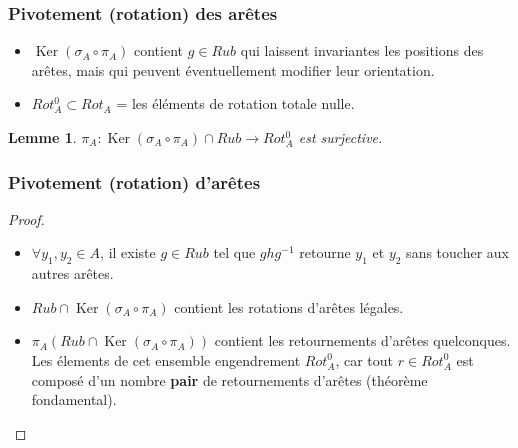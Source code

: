 \documentclass[10pt,notheorems]{beamer}
\theoremstyle{plain}
\theoremstyle{definition}
\theoremstyle{plain}
\theoremstyle{plain}
\newtheorem{lemma}{Lemme}
\theoremstyle{plain}
\theoremstyle{remark}
\begin{document}
\begin{frame}
  \frametitle{Pivotement (rotation) des arêtes}

  \begin{itemize}
    \item $\operatorname{Ker}(\sigma_A \circ \pi_A)$ contient $g \in Rub$ qui laissent invariantes les positions des arêtes, mais qui peuvent éventuellement modifier leur orientation.
    \item $Rot_A ^{0} \subset Rot_A$ = les éléments de rotation totale nulle.
  \end{itemize}

  \begin{lemma}
    $\pi_A : \operatorname{Ker}(\sigma_A \circ \pi_A) \cap Rub \to Rot_A ^{0}$ est surjective.
  \end{lemma}
\end{frame}



\begin{frame}
  \frametitle{Pivotement (rotation) d'arêtes}

  \begin{proof}
    \begin{itemize}
      \item $\forall y_1, y_2 \in A$, il existe $g \in Rub$ tel que $g h g ^{-1} $ retourne $y_1$ et $y_2$ sans toucher aux autres arêtes.
      \item $Rub \cap \operatorname{Ker}(\sigma_A \circ \pi_A)$ contient les rotations d'arêtes légales.
      \item $\pi_A (Rub \cap \operatorname{Ker}(\sigma_A \circ \pi_A))$ contient les retournements d'arêtes quelconques. Les élements de cet ensemble engendrement $Rot_A ^{0}$, car tout $r \in Rot_A ^{0}$ est composé d'un nombre \textbf{pair} de retournements d'arêtes (théorème fondamental).
    \end{itemize}
  \end{proof}
\end{frame}
\end{document}
